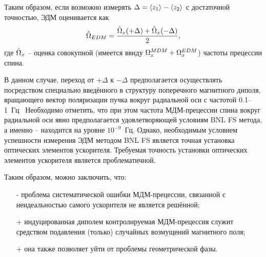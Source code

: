 Таким образом, если возможно измерять $\Delta = \avg{z_1} - \avg{z_2}$ с достаточной точностью, 
ЭДМ оценивается как
\begin{equation}\label{eq:SW:EDM-estimator}
	\hat{\Omega}_{EDM} = \frac{\hat{\Omega}_x(+\Delta) + \hat{\Omega}_x(-\Delta)}{2},
\end{equation}
где $\hat{\Omega}_x$ -- оценка совокупной (имеется ввиду $\Omega_x^{MDM} + \Omega_x^{EDM}$) частоты прецессии спина.

В данном случае, переход от $+\Delta$ к $-\Delta$ предполагается осуществлять посредством специально введённого
в структуру поперечного магнитного диполя, вращающего вектор поляризации пучка вокруг радиальной оси
с частотой 0.1--1~Гц~\cite[стр.~4]{Koop:SpinWheel2015} Необходимо отметить, что при этом частота 
МДМ-прецессии спина вокруг радиальной оси явно предполагается удовлетворяющей условиям BNL FS метода, 
а именно -- находится на уровне $10^{-9}$~Гц. Однако, необходимым условием успешности измерения ЭДМ
методом BNL FS является точная установка оптических элементов ускорителя. Требуемая
точность установки оптических элементов ускорителя является проблематичной.

Таким образом, можно заключить, что:
\begin{itemize}
	\item[-] проблема систематической ошибки МДМ-прецессии, связанной с неидеальностью самого ускорителя 
	не является решённой;
	\item[+] индуцированная диполем контролируемая МДМ-прецессия служит средством подавления (только)
	случайных возмущений магнитного поля;
	\item[+] она также позволяет уйти от проблемы геометрической фазы.
\end{itemize}

